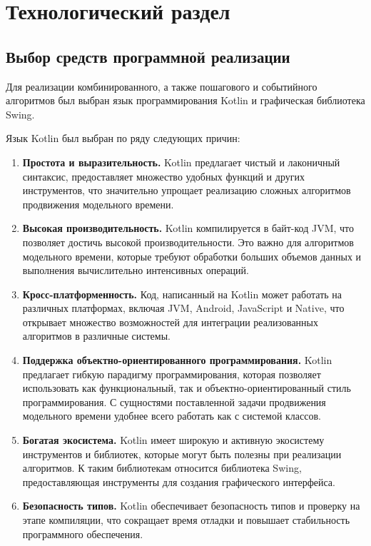 \chapter{Технологический раздел}

\section{Выбор средств программной реализации}
Для реализации комбинированного, а также пошагового и событийного алгоритмов был выбран язык программирования Kotlin и графическая библиотека Swing.

Язык Kotlin был выбран по ряду следующих причин:

\begin{enumerate}
	\item \textbf{Простота и выразительность.} Kotlin предлагает чистый и лаконичный синтаксис, предоставляет множество удобных функций и других инструментов, что значительно упрощает реализацию сложных алгоритмов продвижения модельного времени.
	
	\item \textbf{Высокая производительность.} Kotlin компилируется в байт-код JVM, что позволяет достичь высокой производительности. Это важно для алгоритмов модельного времени, которые требуют обработки больших объемов данных и выполнения вычислительно интенсивных операций.
	
	\item \textbf{Кросс-платформенность.} Код, написанный на Kotlin может работать на различных платформах, включая JVM, Android, JavaScript и Native, что открывает множество возможностей для интеграции реализованных алгоритмов в различные системы.
	
	\item \textbf{Поддержка объектно-ориентированного программирования.} Kotlin предлагает гибкую парадигму программирования, которая позволяет использовать как функциональный, так и объектно-ориентированный стиль программирования. С сущностями поставленной задачи продвижения модельного времени удобнее всего работать как с системой классов.
	
	\item \textbf{Богатая экосистема.} Kotlin имеет широкую и активную экосистему инструментов и библиотек, которые могут быть полезны при реализации алгоритмов. К таким библиотекам относится библиотека Swing, предоставляющая инструменты для создания графического интерфейса.
	
	\item \textbf{Безопасность типов.} Kotlin обеспечивает безопасность типов и проверку на этапе компиляции, что сокращает время отладки и повышает стабильность программного обеспечения.
\end{enumerate}


